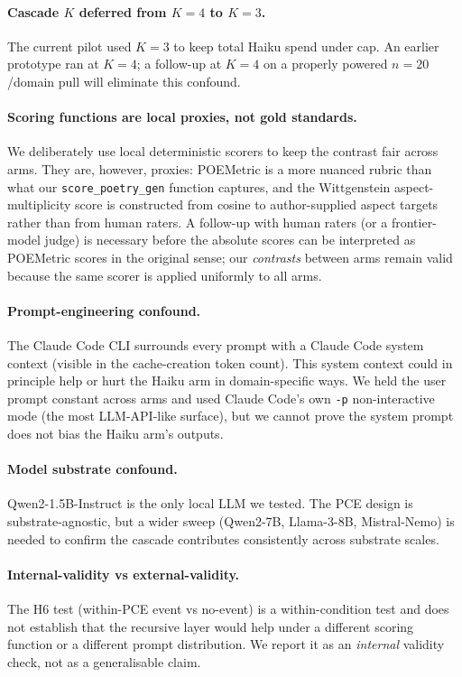 \paragraph{Cascade $K$ deferred from $K{=}4$ to $K{=}3$.} The current pilot used $K{=}3$ to keep total Haiku spend under cap. An earlier prototype ran at $K{=}4$; a follow-up at $K{=}4$ on a properly powered $n{=}20$/domain pull will eliminate this confound.

\paragraph{Scoring functions are local proxies, not gold standards.} We deliberately use local deterministic scorers to keep the contrast fair across arms. They are, however, proxies: POEMetric is a more nuanced rubric than what our \texttt{score\_poetry\_gen} function captures, and the Wittgenstein aspect-multiplicity score is constructed from cosine to author-supplied aspect targets rather than from human raters. A follow-up with human raters (or a frontier-model judge) is necessary before the absolute scores can be interpreted as POEMetric scores in the original sense; our \emph{contrasts} between arms remain valid because the same scorer is applied uniformly to all arms.

\paragraph{Prompt-engineering confound.} The Claude Code CLI surrounds every prompt with a Claude Code system context (visible in the cache-creation token count). This system context could in principle help or hurt the Haiku arm in domain-specific ways. We held the user prompt constant across arms and used Claude Code's own \texttt{-p} non-interactive mode (the most LLM-API-like surface), but we cannot prove the system prompt does not bias the Haiku arm's outputs.

\paragraph{Model substrate confound.} Qwen2-1.5B-Instruct is the only local LLM we tested. The PCE design is substrate-agnostic, but a wider sweep (Qwen2-7B, Llama-3-8B, Mistral-Nemo) is needed to confirm the cascade contributes consistently across substrate scales.

\paragraph{Internal-validity vs external-validity.} The H6 test (within-PCE event vs no-event) is a within-condition test and does not establish that the recursive layer would help under a different scoring function or a different prompt distribution. We report it as an \emph{internal} validity check, not as a generalisable claim.

